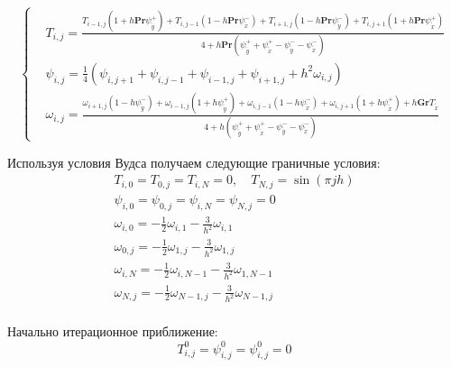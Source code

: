 \documentclass[a4paper, 12pt]{article}
\newcommand{\Pra}{\mathbf{Pr}}
\newcommand{\Gra}{\mathbf{Gr}}
\newcommand{\psp}[2]{\psi_{\mathring{#1}}^{#2}}
\begin{document}
    \begin{equation}
      \left\{
        \begin{aligned}
          &T_{i,j} =
            \frac{
              T_{i-1,j}\left(
                1 + h \Pra \psp{y}{+}
              \right) +
              T_{i,j-1}\left(
                1 - h \Pra \psp{x}{-}
              \right) +
              T_{i+1,j}\left(
                1 - h \Pra \psp{y}{-}
              \right) +
              T_{i,j+1}\left(
                1 + h \Pra \psp{x}{+}
              \right)
            }{4 + h \Pra \left(
              \psp{y}{+} + \psp{x}{+} - \psp{y}{-} - \psp{x}{-}
            \right)}
          \\
          &\psi_{i,j} = \frac{1}{4} \left(
            \psi_{i,j+1} + \psi_{i,j-1} + \psi_{i-1,j} + \psi_{i+1,j} +
            h^2 \omega_{i,j}
          \right)
          \\
          &\omega_{i,j} =
            \frac{
              \omega_{i+1, j} \left( 1 - h \psp{y}{-} \right) +
              \omega_{i-1, j} \left( 1 + h \psp{y}{+} \right) +
              \omega_{i, j-1} \left( 1 - h \psp{x}{-} \right) +
              \omega_{i, j+1} \left( 1 + h \psp{x}{+} \right) +
              h \Gra T_{\mathring{x}}
            }{4 + h \left(
              \psp{y}{+} + \psp{x}{+} - \psp{y}{-} - \psp{x}{-}
            \right)}
        \end{aligned}
      \right.
    \end{equation}

    Используя условия Вудса получаем следующие граничные условия:
    \begin{gather*}
      T_{i,0} = T_{0,j} = T_{i,N} = 0, \quad T_{N,j} = \sin (\pi j h)
      \\
      \psi_{i,0} = \psi_{0,j} = \psi_{i,N} = \psi_{N,j} = 0
      \\
      \omega_{i,0} = - \frac{1}{2} \omega_{i,1} - \frac{3}{h^2} \omega_{i,1}
      \\
      \omega_{0,j} = - \frac{1}{2} \omega_{1,j} - \frac{3}{h^2} \omega_{1,j}
      \\
      \omega_{i,N} = - \frac{1}{2} \omega_{i,N-1} - \frac{3}{h^2} \omega_{1,N-1}
      \\
      \omega_{N,j} = - \frac{1}{2} \omega_{N-1,j} - \frac{3}{h^2} \omega_{N-1,j}
      \\
    \end{gather*}

    Начально итерационное приближение:
    $$
      T_{i,j}^0 = \psi_{i,j}^{0} = \psi_{i,j}^{0} = 0
    $$
\end{document}
